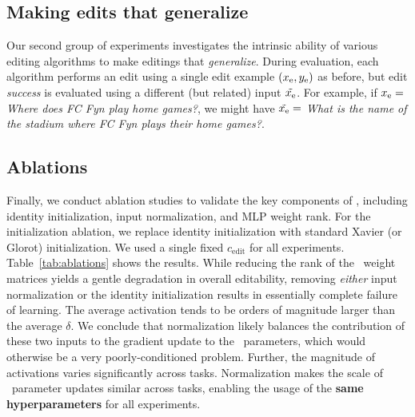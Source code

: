 \documentclass{article}
\begin{document}
\subsection{Making edits that generalize}
Our second group of experiments investigates the intrinsic ability of various editing algorithms to make editings that \textit{generalize}. During evaluation, each algorithm performs an edit using a single edit example $(x_\text{e}, y_\text{e})$ as before, but edit \textit{success} is evaluated using a different (but related) input $\tilde {x_\text{e}}$. For example, if $x_\text{e}=$ \textit{Where does FC Fyn play home games?}, we might have $\tilde {x_\text{e}}=$ \textit{What is the name of the stadium where FC Fyn plays their home games?}.


\subsection{Ablations}
\label{sec:ablations}
Finally, we conduct ablation studies to validate the key components of \name, including identity initialization, input normalization, and MLP weight rank. For the initialization ablation, we replace identity initialization with standard Xavier (or Glorot) initialization. We used a single fixed $c_\text{edit}$ for all experiments. Table~\ref{tab:ablations} shows the results. While reducing the rank of the \name~weight matrices yields a gentle degradation in overall editability, removing \textit{either} input normalization or the identity initialization results in essentially complete failure of learning. 
The average activation tends to be orders of magnitude larger than the average $\delta$. We conclude that normalization likely balances the contribution of these two inputs to the gradient update to the \name~parameters, which would otherwise be a very poorly-conditioned problem. Further, the magnitude of activations varies significantly across tasks. Normalization makes the scale of \name~parameter updates similar across tasks, enabling the usage of the \textbf{same hyperparameters} for all experiments.
\end{document}
